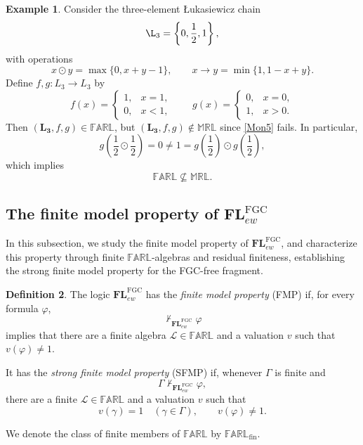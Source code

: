 \documentclass[final,12pt,times]{elsarticle}
\theoremstyle{plain}
\theoremstyle{definition}
\newtheorem{definition}{Definition}[section]
\newtheorem{example}[definition]{Example}
\theoremstyle{break}
\newcommand{\FARL}{\mathbb{FARL}}
\newcommand{\MRL}{\mathbb{MRL}}
\begin{document}
\begin{example}\label{exm:FARL2}
Consider the three-element \L{}ukasiewicz chain
\[
\L_{3}
=
\left\{0,\frac12,1\right\},
\]
with operations
\[
x\odot y=\max\{0,x+y-1\},
\qquad
x\to y=\min\{1,1-x+y\}.
\]
Define \(f,g\colon L_{3}\to L_{3}\) by
\[
f(x)=
\begin{cases}
1, & x=1,\\
0, & x<1,
\end{cases}
\qquad
g(x)=
\begin{cases}
0, & x=0,\\
1, & x>0.
\end{cases}
\]
Then $(\mathbf{L_{3}},f,g)\in\FARL$, but $(\mathbf{L_{3}},f,g)\notin\MRL$ since \eqref{Mon5} fails. In particular,
\[
g\left(\frac12\odot\frac12\right)
=
0\neq 1=g\left(\frac12\right)\odot g\left(\frac12\right),
\]
which implies
\[
\FARL\nsubseteq \MRL.
\]
\end{example}

\subsection{The finite model property of $\mathbf{FL}^{\mathrm{FGC}}_{ew}$}\label{subsection:FMP-FGC}


In this subsection, we study the finite model property of $\mathbf{FL}^{\mathrm{FGC}}_{ew}$, and characterize this property through finite $\FARL$-algebras and residual finiteness, establishing the strong finite model property for the FGC-free fragment.

\begin{definition}\label{def:FMP-FGC}
The logic $\mathbf{FL}^{\mathrm{FGC}}_{ew}$ has the \emph{finite model
property} (FMP) if, for every formula $\varphi$,
\[
 \nvdash_{\mathbf{FL}^{\mathrm{FGC}}_{ew}}\varphi
\]
implies that there are a finite algebra $\mathscr{L}\in\FARL$ and a
valuation $v$ such that $v(\varphi)\ne1$.

It has the \emph{strong finite model property} (SFMP) if, whenever $\Gamma$ is
finite and
\[
 \Gamma\nvdash_{\mathbf{FL}^{\mathrm{FGC}}_{ew}}\varphi,
\]
there are a finite $\mathscr{L}\in\FARL$ and a valuation $v$ such that
\[
 v(\gamma)=1\quad(\gamma\in\Gamma),
 \qquad
 v(\varphi)\ne1.
\]

We denote the class of finite members of $\FARL$ by
$\FARL_{\mathrm{fin}}$.
\end{definition}
\end{document}
